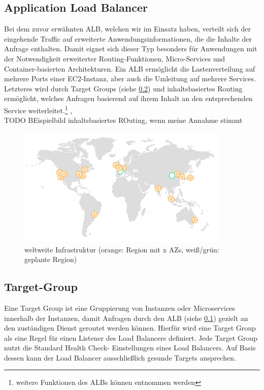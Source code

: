 \subsection{Application Load Balancer}
\label{sec:alb}
Bei dem zuvor erwähnten ALB, welchen wir im Einsatz haben, verteilt sich der eingehende Traffic auf erweiterte Anwendungsinformationen, die die Inhalte der Anfrage enthalten. Damit eignet sich dieser Typ besonders für Anwendungen mit der Notwendigkeit erweiterter Routing-Funktionen, Micro-Services und Container-basierten Architekturen. Ein ALB ermöglicht die Lastenverteilung auf mehrere Ports einer EC2-Instanz, aber auch die Umleitung auf mehrere Services. Letzteres wird durch Target Groups (siehe \ref{sec:target-group}) und inhaltsbasiertes Routing ermöglicht, welches Anfragen basierend auf ihrem Inhalt an den entsprechenden Service weiterleitet.\footnote{weitere Funktionen des ALBs können \cite{aws:alb} entnommen werden} \cite{aws:elb}, \cite{aws:alb} \\

TODO BEispielbild inhaltsbasiertes ROuting, wenn meine Annahme stimmt

\begin{figure}[!ht]
  \centering
  \includegraphics[width=0.9\textwidth]{images/regions.png}
  \caption{weltweite Infrastruktur (orange: Region mit x AZs, weiß/grün: geplante Region) \cite{aws:regions}}
\end{figure}



\subsection{Target-Group}
\label{sec:target-group}
Eine Target Group ist eine Gruppierung von Instanzen oder Microservices innerhalb der Instanzen, damit Anfragen durch den ALB (siehe \ref{sec:alb}) gezielt an den zuständigen Dienst geroutet werden können. Hierfür wird eine Target Group als eine Regel für einen Listener des Load Balancers definiert. Jede Target Group nutzt die Standard Health Check- Einstellungen eines Load Balancers. Auf Basis dessen kann der Load Balancer ausschließlich gesunde Targets ansprechen. \cite{aws:target} \\

